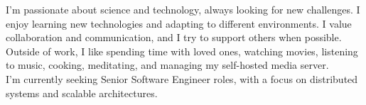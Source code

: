 \vspace{-1.5em}
\vspace{0.5em}
I'm passionate about science and technology, always looking for new challenges. I enjoy learning new technologies and adapting to different environments. I value collaboration and communication, and I try to support others when possible.\\
Outside of work, I like spending time with loved ones, watching movies, listening to music, cooking, meditating, and managing my self-hosted media server.\\
I’m currently seeking Senior Software Engineer roles, with a focus on distributed systems and scalable architectures.
